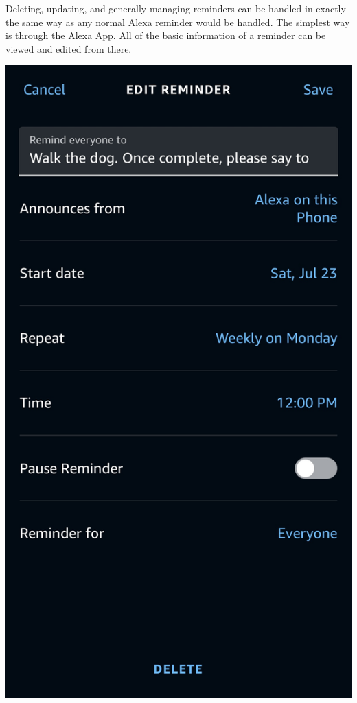 \documentclass[11pt, oneside]{article}
\begin{document}
Deleting, updating, and generally managing reminders can be handled in exactly the same way as any normal Alexa reminder would be handled. The simplest way is through the Alexa App. All of the basic information of a reminder can be viewed and edited from there.
\begin{center}
  \includegraphics[width=\linewidth * 1/2]{images/inAppReminderSettings.jpg}
\end{center}
\end{document}
